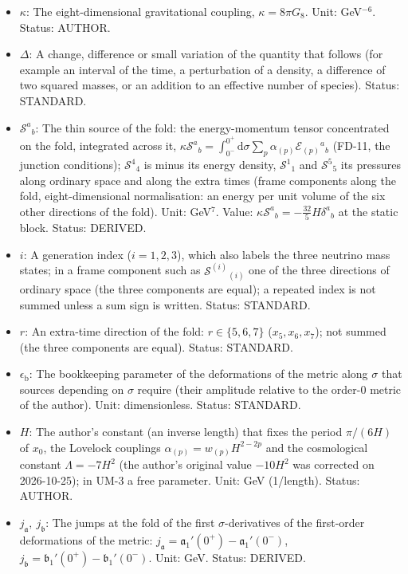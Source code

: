\documentclass[
  10pt,
]{article}
\providecommand{\tightlist}{%
  \setlength{\itemsep}{0pt}\setlength{\parskip}{0pt}}
\begin{document}
\begin{itemize}
\tightlist
\item
  \(\kappa\): The eight-dimensional gravitational coupling,
  \(\kappa = 8\pi G_8\). Unit: GeV\(^{-6}\). Status: AUTHOR.
\item
  \(\Delta\): A change, difference or small variation of the quantity
  that follows (for example an interval of the time, a perturbation of a
  density, a difference of two squared masses, or an addition to an
  effective number of species). Status: STANDARD.
\item
  \(\mathcal{S}^a{}_b\): The thin source of the fold: the
  energy-momentum tensor concentrated on the fold, integrated across it,
  \(\kappa\mathcal{S}^a{}_b = \int_{0^-}^{0^+}\mathrm{d}\sigma\sum_p\alpha_{(p)}\mathcal{E}_{(p)}{}^a{}_b\)
  (FD-11, the junction conditions); \(\mathcal{S}^4{}_4\) is minus its
  energy density, \(\mathcal{S}^1{}_1\) and \(\mathcal{S}^5{}_5\) its
  pressures along ordinary space and along the extra times (frame
  components along the fold, eight-dimensional normalisation: an energy
  per unit volume of the six other directions of the fold). Unit:
  GeV\(^7\). Value:
  \(\kappa\mathcal{S}^a{}_b = -\frac{32}{5}H\delta^a{}_b\) at the static
  block. Status: DERIVED.
\item
  \(i\): A generation index (\(i = 1, 2, 3\)), which also labels the
  three neutrino mass states; in a frame component such as
  \(\mathcal{S}^{(i)}{}_{(i)}\) one of the three directions of ordinary
  space (the three components are equal); a repeated index is not summed
  unless a sum sign is written. Status: STANDARD.
\item
  \(r\): An extra-time direction of the fold: \(r \in \{5, 6, 7\}\)
  (\(x_5, x_6, x_7\)); not summed (the three components are equal).
  Status: STANDARD.
\item
  \(\epsilon_{\mathrm{b}}\): The bookkeeping parameter of the
  deformations of the metric along \(\sigma\) that sources depending on
  \(\sigma\) require (their amplitude relative to the order-0 metric of
  the author). Unit: dimensionless. Status: STANDARD.
\item
  \(H\): The author's constant (an inverse length) that fixes the period
  \(\pi/(6H)\) of \(x_0\), the Lovelock couplings
  \(\alpha_{(p)} = w_{(p)}H^{2-2p}\) and the cosmological constant
  \(\Lambda = -7H^2\) (the author's original value \(-10H^2\) was
  corrected on 2026-10-25); in UM-3 a free parameter. Unit: GeV
  (1/length). Status: AUTHOR.
\item
  \(j_{\mathfrak{a}},\ j_{\mathfrak{b}}\): The jumps at the fold of the
  first \(\sigma\)-derivatives of the first-order deformations of the
  metric:
  \(j_{\mathfrak{a}} = \mathfrak{a}_1'(0^+) - \mathfrak{a}_1'(0^-)\),
  \(j_{\mathfrak{b}} = \mathfrak{b}_1'(0^+) - \mathfrak{b}_1'(0^-)\).
  Unit: GeV. Status: DERIVED.
\end{itemize}
\end{document}
